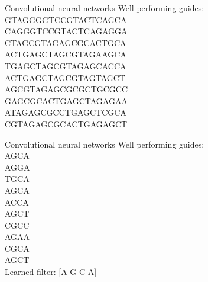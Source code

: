 \documentclass[Nike]{tuberlinbeamer}
\begin{document}
\begin{frame}{Convolutional neural networks}
  Well performing guides: \\
  {\large
    GTAGGGGTCCGTACTCAGCA \\
    CAGGGTCCGTACTCAGAGGA \\
    CTAGCGTAGAGCGCACTGCA \\
    ACTGAGCTAGCGTAGAAGCA \\
    TGAGCTAGCGTAGAGCACCA \\
    ACTGAGCTAGCGTAGTAGCT \\
    AGCGTAGAGCGCGCTGCGCC \\
    GAGCGCACTGAGCTAGAGAA \\
    ATAGAGCGCCTGAGCTCGCA \\
    CGTAGAGCGCACTGAGAGCT \\
  }
\end{frame}

\begin{frame}{Convolutional neural networks}
  Well performing guides: \\
  {\large
    AGCA \\
    AGGA \\
    TGCA \\
    AGCA \\
    ACCA \\
    AGCT \\
    CGCC \\
    AGAA \\
    CGCA \\
    AGCT \\
  }
  \pause
  Learned filter: {[A G C A]}
\end{frame}
\end{document}
